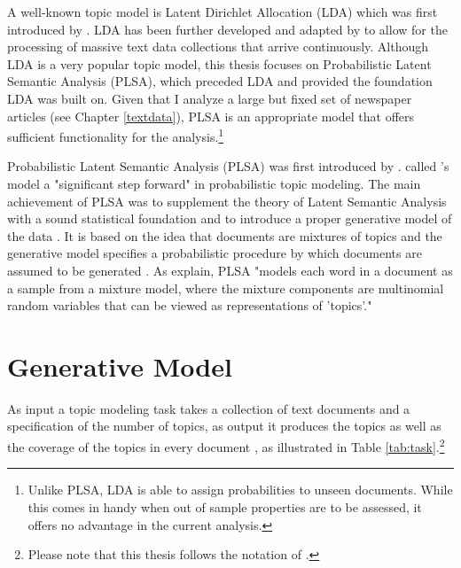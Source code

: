 \documentclass[11pt,a4paper,english,oneside]{book}
\numberwithin{equation}{chapter}
\begin{document}
A well-known topic model is Latent Dirichlet Allocation (LDA) which was first introduced by \cite{Blei.2003}. LDA has been further developed and adapted by \cite{Hoffman2010} to allow for the processing of massive text data collections that arrive continuously. Although LDA is a very popular topic model, this thesis focuses on Probabilistic Latent Semantic Analysis (PLSA), which preceded LDA and provided the foundation LDA was built on. Given that I analyze a large but fixed set of newspaper articles (see Chapter \ref{textdata}), PLSA is an appropriate model that offers sufficient functionality for the analysis.\footnote{Unlike PLSA, LDA is able to assign probabilities to unseen documents. While this comes in handy when out of sample properties are to be assessed, it offers no advantage in the current analysis.}

Probabilistic Latent Semantic Analysis (PLSA) was first introduced by \cite{Hofmann.1999}. \citet[p.~994]{Blei.2003} called \citeauthor{Hofmann.1999}'s model a "significant step forward" in probabilistic topic modeling. The main achievement of PLSA was to supplement the theory of Latent Semantic Analysis with a sound statistical foundation and to introduce a proper generative model of the data \cite[p. 289]{Hofmann.1999}. It is based on the idea that documents are mixtures of topics and the generative model specifies a probabilistic procedure by which documents are assumed to be generated \cite[p.~2]{Steyvers(2007)}. As \citet[p. 994]{Blei.2003} explain, PLSA "models each word in a document as a sample from a mixture model, where the mixture components are multinomial random variables that can be viewed as representations of 'topics'."


\section{Generative Model}\label{GM}
As input a topic modeling task takes a collection of text documents and a specification of the number of topics, as output it produces the topics as well as the coverage  of the topics in every document \cite[pp.~330--331]{Zhai.2016}, as illustrated in Table \ref{tab:task}.\footnote{Please note that this thesis follows the notation of \cite{Zhai.2016}.} 
	
\end{document}
